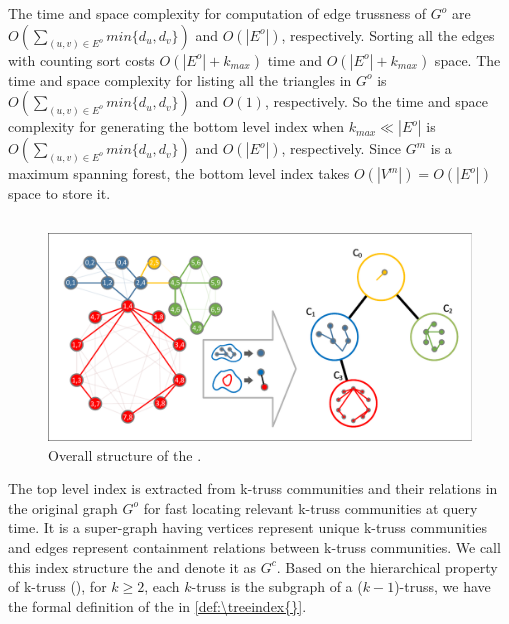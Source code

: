 The time and space complexity for computation of edge trussness of $G^o$ are $O(\sum_{(u,v) \in E^{o}}{min\{d_{u},d_{v}\}})$ and $O(|E^{o}|)$,  respectively. Sorting all the edges with counting sort costs $O(|E^{o}| + k_{max})$ time and $O(|E^{o}| + k_{max})$ space. The time and space complexity for listing all the triangles in $G^o$ is $O(\sum_{(u,v) \in E^{o}}{min\{d_{u},d_{v}\}})$ and $O(1)$, respectively. So the time and space complexity for generating the bottom level index when $k_{max} \ll |E^{o}|$ is $O(\sum_{(u,v) \in E^{o}} {min\{d_{u},d_{v}\}})$ and $O(|E^{o}|)$,  respectively. Since $G^m$ is a maximum spanning forest, the bottom level index takes $O(|V^{m}|) = O(|E^{o}|)$ space to store it.

\subsection{\TreeIndex{}}
\label{top-level}

\begin{figure}[ht]
    \centering
    \includegraphics[width=0.8\linewidth, trim={0.1cm 0.1cm, 0.1cm, 0.1cm}, clip]{./figures/top_level.pdf}
    \caption{Overall structure of the \twolevelindex{}.}
    \label{fig:top-level}
\end{figure}

The top level index is extracted from k-truss communities and their relations in the original graph $G^o$ for fast locating relevant k-truss communities at query time. It is a super-graph having vertices represent unique k-truss communities and edges represent containment relations between k-truss communities. We call this index structure the \treeindex{} and denote it as $G^c$. Based on the hierarchical property of k-truss (\cite{cohen2008trusses}), \ie for $k \ge 2$, each $k$-truss is the subgraph of a ($k-1$)-truss, we have the formal definition of the \treeindex{} in \autoref{def:\treeindex{}}.


